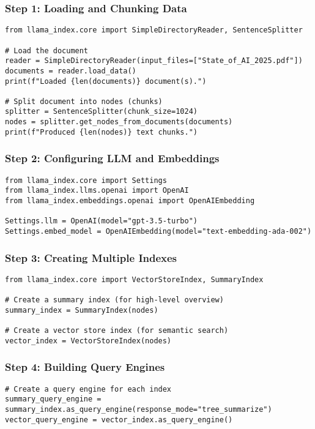 \begin{frame}[fragile]\frametitle{Step 1: Loading and Chunking Data}


		\begin{lstlisting}
from llama_index.core import SimpleDirectoryReader, SentenceSplitter

# Load the document
reader = SimpleDirectoryReader(input_files=["State_of_AI_2025.pdf"])
documents = reader.load_data()
print(f"Loaded {len(documents)} document(s).")

# Split document into nodes (chunks)
splitter = SentenceSplitter(chunk_size=1024)
nodes = splitter.get_nodes_from_documents(documents)
print(f"Produced {len(nodes)} text chunks.")
		\end{lstlisting}	

\end{frame}

\begin{frame}[fragile]\frametitle{Step 2: Configuring LLM and Embeddings}


		\begin{lstlisting}
from llama_index.core import Settings
from llama_index.llms.openai import OpenAI
from llama_index.embeddings.openai import OpenAIEmbedding

Settings.llm = OpenAI(model="gpt-3.5-turbo")
Settings.embed_model = OpenAIEmbedding(model="text-embedding-ada-002")
		\end{lstlisting}	

\end{frame}


\begin{frame}[fragile]\frametitle{Step 3: Creating Multiple Indexes}


		\begin{lstlisting}
from llama_index.core import VectorStoreIndex, SummaryIndex

# Create a summary index (for high-level overview)
summary_index = SummaryIndex(nodes)

# Create a vector store index (for semantic search)
vector_index = VectorStoreIndex(nodes)
		\end{lstlisting}	

\end{frame}

\begin{frame}[fragile]\frametitle{Step 4: Building Query Engines}


		\begin{lstlisting}
# Create a query engine for each index
summary_query_engine = summary_index.as_query_engine(response_mode="tree_summarize")
vector_query_engine = vector_index.as_query_engine()
		\end{lstlisting}	

\end{frame}


